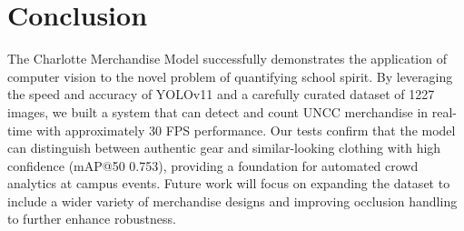 \section{Conclusion}
\label{sec:conclusion}

The Charlotte Merchandise Model successfully demonstrates the application of computer vision to the novel problem of quantifying school spirit. By leveraging the speed and accuracy of YOLOv11 and a carefully curated dataset of 1227 images, we built a system that can detect and count UNCC merchandise in real-time with approximately 30 FPS performance. Our tests confirm that the model can distinguish between authentic gear and similar-looking clothing with high confidence (mAP@50 0.753), providing a foundation for automated crowd analytics at campus events. Future work will focus on expanding the dataset to include a wider variety of merchandise designs and improving occlusion handling to further enhance robustness.

